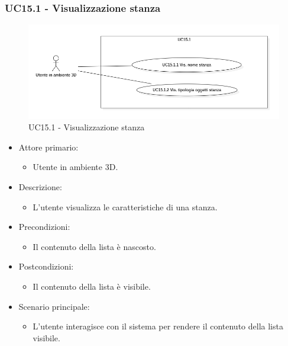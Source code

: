 \subsubsection{UC15.1 - Visualizzazione stanza}

\begin{figure}[H]
  \renewcommand{\thefigure}{19}
  \includegraphics[width=\linewidth]{./res/images/UC15.1.png}
  \caption{UC15.1 - Visualizzazione stanza}
  \label{fig:UC 15.1}
\end{figure}

\begin{itemize}

	\item Attore primario: 
	\begin{itemize}
		\item Utente in ambiente 3D.
	\end{itemize}
	\item Descrizione:
	\begin{itemize}
		\item L'utente visualizza le caratteristiche di una stanza.
	\end{itemize}
	
	\item Precondizioni:
	\begin{itemize}
		\item Il contenuto della lista è nascosto.
	\end{itemize}
	
	\item Postcondizioni:
	\begin{itemize}
		\item Il contenuto della lista è visibile.
	\end{itemize}
	
	\item Scenario principale:
	\begin{itemize}
		\item L'utente interagisce con il sistema per rendere il contenuto della lista visibile.
	\end{itemize}
	
\end{itemize}

